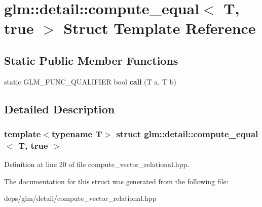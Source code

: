 \hypertarget{structglm_1_1detail_1_1compute__equal_3_01T_00_01true_01_4}{}\section{glm\+:\+:detail\+:\+:compute\+\_\+equal$<$ T, true $>$ Struct Template Reference}
\label{structglm_1_1detail_1_1compute__equal_3_01T_00_01true_01_4}
\subsection*{Static Public Member Functions}
\begin{DoxyCompactItemize}
\item 
\mbox{\label{structglm_1_1detail_1_1compute__equal_3_01T_00_01true_01_4_a00aa995e3aaa83a28954111247a14243}} 
static G\+L\+M\+\_\+\+F\+U\+N\+C\+\_\+\+Q\+U\+A\+L\+I\+F\+I\+ER bool {\bfseries call} (T a, T b)
\end{DoxyCompactItemize}


\subsection{Detailed Description}
\subsubsection*{template$<$typename T$>$\newline
struct glm\+::detail\+::compute\+\_\+equal$<$ T, true $>$}



Definition at line 20 of file compute\+\_\+vector\+\_\+relational.\+hpp.



The documentation for this struct was generated from the following file\+:\begin{DoxyCompactItemize}
\item 
deps/glm/detail/compute\+\_\+vector\+\_\+relational.\+hpp\end{DoxyCompactItemize}
